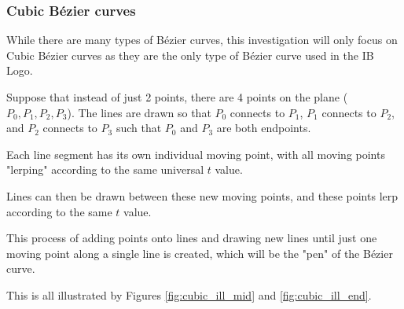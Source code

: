 \documentclass[letterpaper, 12pt]{article}
\begin{document}
\subsubsection{Cubic Bézier curves}

While there are many types of Bézier curves, this investigation will
only focus on Cubic Bézier curves as they are the only type of Bézier curve used in the IB Logo.

Suppose that instead of just 2 points, there are 4 points on the
plane (\(P_0, P_1, P_2, P_3\)). The lines are drawn so that
\(P_0\) connects to \(P_1\), \(P_1\) connects to \(P_2\), and
\(P_2\) connects to \(P_3\) such that \(P_0\) and \(P_3\) are both
endpoints.

Each line segment has its own individual moving point, with all moving
points "lerping" according to the same universal \(t\) value.

Lines can then be drawn between these new moving points, and
these points lerp according to the same \(t\) value.

This process of adding points onto lines and drawing new lines
until just one moving point along a single line is created, which
will be the "pen" of the Bézier curve.

This is all illustrated by Figures \ref*{fig:cubic_ill_mid} and \ref*{fig:cubic_ill_end}.
\end{document}
